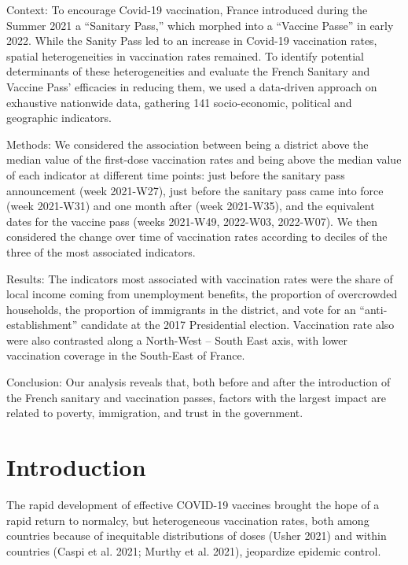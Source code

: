 \documentclass[
]{article}
\begin{document}
Context: To encourage Covid-19 vaccination, France introduced during the
Summer 2021 a ``Sanitary Pass,'' which morphed into a ``Vaccine Passe''
in early 2022. While the Sanity Pass led to an increase in Covid-19
vaccination rates, spatial heterogeneities in vaccination rates
remained. To identify potential determinants of these heterogeneities
and evaluate the French Sanitary and Vaccine Pass' efficacies in
reducing them, we used a data-driven approach on exhaustive nationwide
data, gathering 141 socio-economic, political and geographic indicators.

Methods: We considered the association between being a district above
the median value of the first-dose vaccination rates and being above the
median value of each indicator at different time points: just before the
sanitary pass announcement (week 2021-W27), just before the sanitary
pass came into force (week 2021-W31) and one month after (week
2021-W35), and the equivalent dates for the vaccine pass (weeks
2021-W49, 2022-W03, 2022-W07). We then considered the change over time
of vaccination rates according to deciles of the three of the most
associated indicators.

Results: The indicators most associated with vaccination rates were the
share of local income coming from unemployment benefits, the proportion
of overcrowded households, the proportion of immigrants in the district,
and vote for an ``anti-establishment'' candidate at the 2017
Presidential election. Vaccination rate also were also contrasted along
a North-West -- South East axis, with lower vaccination coverage in the
South-East of France.

Conclusion: Our analysis reveals that, both before and after the
introduction of the French sanitary and vaccination passes, factors with
the largest impact are related to poverty, immigration, and trust in the
government.

\hypertarget{introduction}{%
\section{Introduction}\label{introduction}}

The rapid development of effective COVID-19 vaccines brought the hope of
a rapid return to normalcy, but heterogeneous vaccination rates, both
among countries because of inequitable distributions of doses (Usher
2021) and within countries (Caspi et al. 2021; Murthy et al. 2021),
jeopardize epidemic control.
\end{document}

